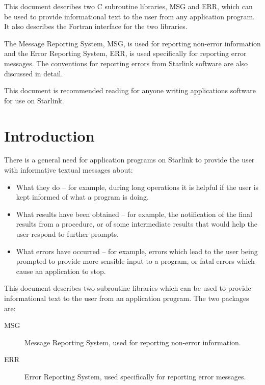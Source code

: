 \documentclass[twoside,11pt]{article}
\newcommand{\stardocinitials}  {SUN}
\newcommand{\stardocnumber}    {104.12}
\newcommand{\stardocabstract}  {
This document describes two C subroutine libraries, MSG and ERR, which 
can be used to provide informational text to the user from any application 
program.
It also describes the Fortran interface for the two libraries.
\par
The Message Reporting System, MSG, is used for reporting non-error information
and the Error Reporting System, ERR, is used specifically for reporting error
messages.
The conventions for reporting errors from Starlink software are also
discussed in detail.
\par
This document is recommended reading for anyone writing applications
software for use on Starlink.
}
\newcommand{\stardocname}{\stardocinitials /\stardocnumber}
\newenvironment{latexonly}{}{}
\newcommand{\xlabel}[1]{}
\renewcommand{\_}{\texttt{\symbol{95}}}
\renewcommand{\thepage}{\roman{page}}
\begin{document}
\stardocabstract
  \newpage
  \begin{latexonly}
    \setlength{\parskip}{0mm}
    \tableofcontents
    \setlength{\parskip}{\medskipamount}
    \markboth{\stardocname}{\stardocname}
  \end{latexonly}
\cleardoublepage
\renewcommand{\thepage}{\arabic{page}}
\setcounter{page}{1}


\section{\xlabel{introduction}Introduction}

There is a general need for application programs on Starlink to provide the
user with informative textual messages about:

\begin {itemize}
\item What they do -- for example, during long operations it is helpful if the
user is kept informed of what a program is doing.

\item What results have been obtained -- for example, the notification of  the
final results from a procedure, or of some intermediate results that would help
the user respond to further prompts. 

\item What errors have occurred -- for example, errors which lead to the user
being prompted to provide more sensible input to a program, or fatal
errors which cause an application to stop.
\end {itemize}

This document describes two subroutine libraries which can be used to provide
informational text to the user from an application program.
The two packages are:

\begin {description}
\item [MSG] Message Reporting System, used for reporting non-error information. 
\item [ERR] Error Reporting System, used specifically for reporting error
messages.
\end {description}
\end{document}
